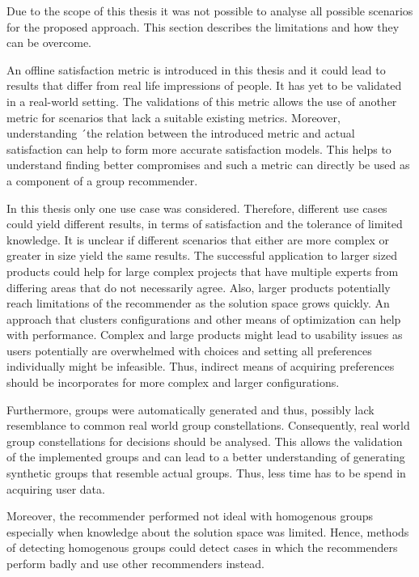 Due to the scope of this thesis it was not possible to analyse all possible scenarios for the proposed approach. This section describes the limitations and how they can be overcome.

An offline satisfaction metric is introduced in this thesis and it could lead to results that differ from real life impressions of people. It has yet to be validated in a real-world setting. The validations of this metric allows the use of another metric for scenarios that lack a suitable existing metrics. Moreover, understanding ´the relation between the introduced metric and actual satisfaction can help to form more accurate satisfaction models. This helps to understand finding better compromises and such a metric can directly be used as a component of a group recommender.

In this thesis only one use case was considered. Therefore, different use cases could yield different results, in terms of satisfaction and the tolerance of limited knowledge. It is unclear if different scenarios that either are more complex or greater in size yield the same results. The successful application to larger sized products could help for large complex projects that have multiple experts from differing areas that do not necessarily agree. Also, larger products potentially reach limitations of the recommender as the solution space grows quickly. An approach that clusters configurations and other means of optimization can help with performance. Complex and large products might lead to usability issues as users potentially are overwhelmed with choices and setting all preferences individually might be infeasible. Thus, indirect means of acquiring preferences should be incorporates for more complex and larger configurations. 

Furthermore, groups were automatically generated and thus, possibly lack resemblance to common real world group constellations. Consequently, real world group constellations for decisions should be analysed. This allows the validation of the implemented groups and can lead to a better understanding of generating synthetic groups that resemble actual groups. Thus, less time has to be spend in acquiring user data.

Moreover, the recommender performed not ideal with homogenous groups especially when knowledge about the solution space was limited. Hence, methods of detecting homogenous groups could detect cases in which the recommenders perform badly and use other recommenders instead.

